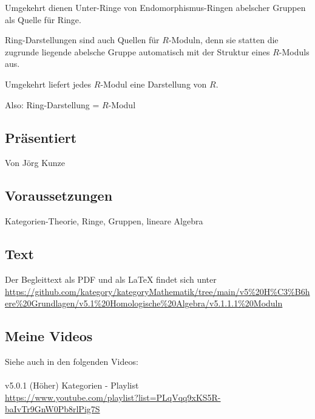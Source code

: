 \documentclass[a4paper]{amsart}
\theoremstyle{definition}
\begin{document}
Umgekehrt dienen Unter-Ringe von Endomorphismus-Ringen abelscher Gruppen als Quelle für Ringe.

Ring-Darstellungen sind auch Quellen für $R$-Moduln, denn sie statten die zugrunde liegende abelsche Gruppe automatisch mit der Struktur eines $R$-Moduls aus.

Umgekehrt liefert jedes $R$-Modul eine Darstellung von $R$.

Also: Ring-Darstellung = $R$-Modul

\subsection*{Präsentiert}
Von Jörg Kunze

\subsection*{Voraussetzungen}
Kategorien-Theorie, Ringe, Gruppen, lineare Algebra

\subsection*{Text}
Der Begleittext als PDF und als LaTeX findet sich unter
{\tiny
   \url{https://github.com/kategory/kategoryMathematik/tree/main/v5%20H%C3%B6here%20Grundlagen/v5.1%20Homologische%20Algebra/v5.1.1.1%20Moduln}
}

\subsection*{Meine Videos}
Siehe auch in den folgenden Videos:\\
\\
v5.0.1 (Höher) Kategorien - Playlist\\
\url{https://www.youtube.com/playlist?list=PLqVqq9xKS5R-baIvTr9GnW0Pb8rlPig7S}
\end{document}
